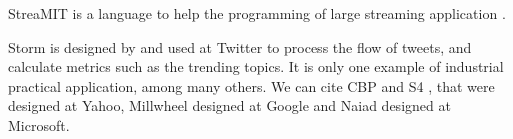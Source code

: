 StreaMIT is a language to help the programming of large streaming application \cite{Thies2002}.

Storm \cite{Toshniwal2014} is designed by and used at Twitter to process the flow of tweets, and calculate metrics such as the trending topics.
It is only one example of industrial practical application, among many others.
We can cite CBP \cite{Logothetis2010} and S4 \cite{Neumeyer2010}, that were designed at Yahoo, Millwheel \cite{Akidau2013} designed at Google and Naiad \cite{Murray2013} designed at Microsoft.


